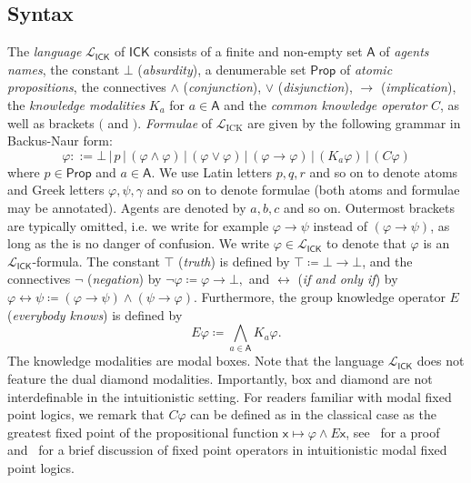 \documentclass{myifcolog}
\newcommand\C {C}
\newcommand{\K}{K}
\newcommand\Prop {\mathsf{Prop}}
\newcommand\A{\mathsf{A}}
\newcommand{\agi}{a}
\newcommand{\agii}{b}
\newcommand{\agiii}{c}
\newcommand{\E}{E}
\newcommand{\ICK}{\mathsf{ICK}}
\newcommand{\LICK}{\mathcal{L}_{\ICK}}
\numberwithin{theorem}{section}
\begin{document}
\subsection{Syntax}\label{ss: syntax}
 The \emph{language} $\LICK$ of $\ICK$ consists of a finite and non-empty set $\A$ of \emph{agents names}, the constant $\bot$ (\emph{absurdity}), a denumerable set $\Prop$ of \emph{atomic propositions}, the connectives $\wedge$ (\emph{conjunction}), $\vee$ (\emph{disjunction}), $\rightarrow$ (\emph{implication}), the \emph{knowledge modalities} $\K_\agi$ for $\agi \in \A$ and the \emph{common knowledge operator} $\C$, as well as brackets $($ and $)$. \emph{Formulae} of $\mathcal{L}_\mathrm{ICK}$ are given by the following grammar in Backus-Naur form:
\begin{equation*}
    \varphi ::= \bot \, \lvert \, p \, \lvert \, (\varphi \wedge \varphi) \, \lvert \, (\varphi \vee \varphi) \, \lvert \, (\varphi \rightarrow \varphi) \, \lvert \, (\K_\agi \varphi) \, \lvert \, (\C \varphi)
\end{equation*}
where $p \in \Prop$ and $\agi \in \A$. We use Latin letters $p,q,r$ and so on to denote atoms and Greek letters $\varphi, \psi, \gamma$ and so on to denote formulae (both atoms and formulae may be annotated). Agents are denoted by $\agi, \agii, \agiii$ and so on. Outermost brackets are typically omitted, i.e. we write for example $\varphi \rightarrow \psi$ instead of $(\varphi \rightarrow \psi)$, as long as the is no danger of confusion. We write $\varphi \in \LICK$ to denote that $\varphi$ is an $\LICK$-formula. The constant $\top$ (\emph{truth}) is defined by $\top \coloneqq \bot \rightarrow \bot$, and the connectives $\neg$ (\emph{negation}) by $\neg \varphi \coloneqq \varphi \rightarrow \bot,$ and $\leftrightarrow$ (\emph{if and only if}) by $\varphi \leftrightarrow \psi \coloneqq (\varphi \rightarrow \psi) \wedge (\psi \rightarrow \varphi)$. Furthermore, the group knowledge operator $\E$ (\emph{everybody knows}) is defined by
\begin{equation*}
    \E \varphi  \coloneqq \bigwedge_{\agi \in \A} \K_\agi \varphi.
\end{equation*}
The knowledge modalities are modal boxes. Note that the language $\LICK$ does not feature the dual diamond modalities. Importantly, box and diamond are not interdefinable in the intuitionistic setting. For readers familiar with modal fixed point logics, we remark that $\C \varphi$ can be defined as in the classical case as the greatest fixed point of the propositional function $\mathsf{x} \mapsto \varphi \wedge \E \mathsf{x}$, see~\cite{marti_2017} for a proof and~\cite{Zenger_2025} for a brief discussion of fixed point operators in intuitionistic modal fixed point logics.
\end{document}
